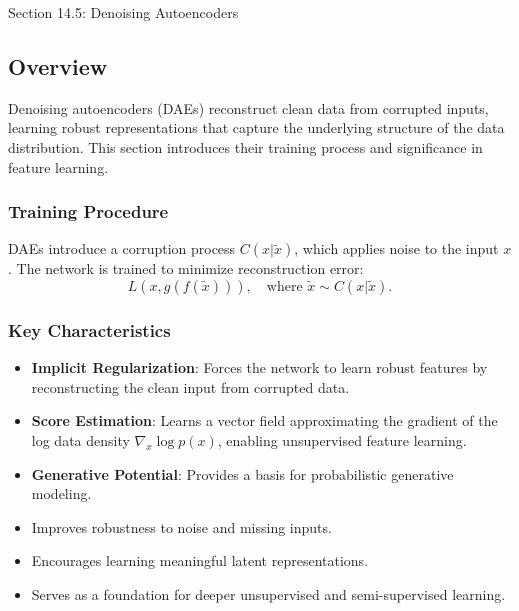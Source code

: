 \begin{notes}{Section 14.5: Denoising Autoencoders}
    \subsection*{Overview}

    Denoising autoencoders (DAEs) reconstruct clean data from corrupted inputs, learning robust representations that capture the underlying structure of the data distribution. This section introduces their 
    training process and significance in feature learning.
    
    \subsubsection*{Training Procedure}
    
    DAEs introduce a corruption process $C(x|\tilde{x})$, which applies noise to the input $x$. The network is trained to minimize reconstruction error:
    \[
    L(x, g(f(\tilde{x}))), \quad \text{where } \tilde{x} \sim C(x|\tilde{x}).
    \]
    
    \subsubsection*{Key Characteristics}
    
    \begin{itemize}
        \item \textbf{Implicit Regularization}: Forces the network to learn robust features by reconstructing the clean input from corrupted data.
        \item \textbf{Score Estimation}: Learns a vector field approximating the gradient of the log data density $\nabla_x \log p(x)$, enabling unsupervised feature learning.
        \item \textbf{Generative Potential}: Provides a basis for probabilistic generative modeling.
    \end{itemize}
    
    \begin{highlight}
        \begin{itemize}
            \item Improves robustness to noise and missing inputs.
            \item Encourages learning meaningful latent representations.
            \item Serves as a foundation for deeper unsupervised and semi-supervised learning.
        \end{itemize}
    \end{highlight}
\end{notes}


